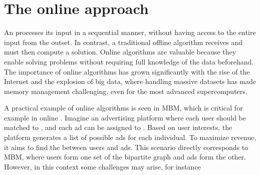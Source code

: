 \documentclass[a4paper, 12pt]{report}
\begin{document}

    \section{The online approach}

    An  processes its input  in a sequential manner, without having access to the entire input from the outset. In contrast, a traditional offline algorithm receives  and must then compute a solution. Online algorithms are valuable because they enable solving problems without requiring full knowledge of the data beforehand. The importance of online algorithms has grown significantly with the rise of the Internet and the explosion of big data, where handling massive datasets has made memory management challenging, even for the most advanced supercomputers.

    A practical example of online algorithms is seen in MBM, which is critical for example in online . Imagine an advertising platform where each user should be matched to , and each ad can be assigned to . Based on user interests, the platform generates a list of possible ads for each individual. To maximize revenue, it aims to find the  between users and ads. This scenario directly corresponds to MBM, where users form one set of the bipartite graph and ads form the other. However, in this context some challenges may arise, for instance
\end{document}

